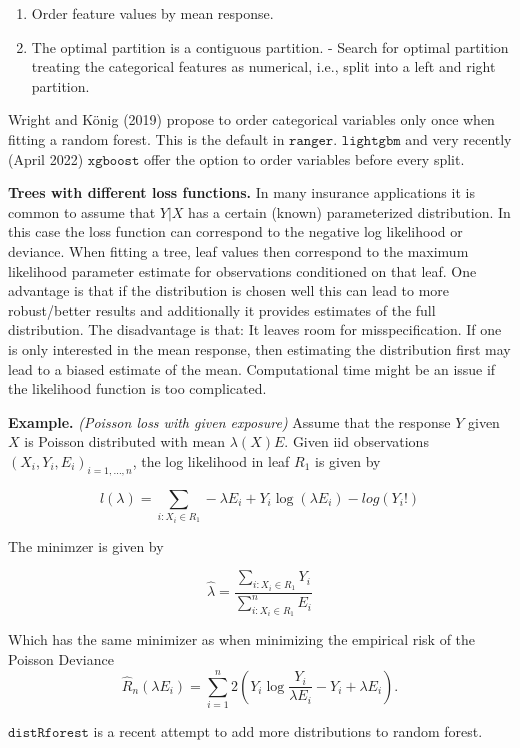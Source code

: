 \documentclass[
]{book}
\providecommand{\tightlist}{%
  \setlength{\itemsep}{0pt}\setlength{\parskip}{0pt}}
\begin{document}
\begin{enumerate}
\def\labelenumi{\arabic{enumi}.}
\tightlist
\item
  Order feature values by mean response.
\item
  The optimal partition is a contiguous partition.
  - Search for optimal partition treating the categorical features as numerical, i.e., split into a left and right partition.
\end{enumerate}

Wright and König (2019) propose to order categorical variables only once when fitting a random forest. This is the default in \(\texttt{ranger}\). \(\texttt{lightgbm}\) and very recently (April 2022) \(\texttt{xgboost}\) offer the option to order variables before every split.

\textbf{Trees with different loss functions.} In many insurance applications it is common to assume that \(Y|X\) has a certain (known) parameterized distribution. In this case the loss function can correspond to the negative log likelihood or deviance. When fitting a tree, leaf values then correspond to the maximum likelihood parameter estimate for observations conditioned on that leaf. One advantage is that if the distribution is chosen well this can lead to more robust/better results and additionally it provides estimates of the full distribution. The disadvantage is that: It leaves room for misspecification. If one is only interested in the mean response, then estimating the distribution first may lead to a biased estimate of the mean. Computational time might be an issue if the likelihood function is too complicated.

\textbf{Example.} \emph{(Poisson loss with given exposure)} Assume that the response \(Y\) given \(X\) is Poisson distributed with mean \(\lambda(X)E\). Given iid observations \((X_i,Y_i,E_i)_{i=1,\dots,n}\), the log likelihood in leaf \(R_1\) is given by

\[
l(\lambda)= \sum_{i: X_i\in R_1} -\lambda E_i+ Y_i\log(\lambda E_i)-log(Y_i!)
\]

The minimzer is given by

\[
\hat \lambda = \frac{\sum_{i: X_i\in R_1}  Y_i}{\sum_{i: X_i\in R_1} ^n E_i}
\]

Which has the same minimizer as when minimizing the empirical risk of the Poisson Deviance
\[
\hat R_n(\lambda E_i)=\sum_{i=1}^n 2\left(Y_i\log {\frac {Y_i}{\lambda E_i }}-Y_i+\lambda E_i \right).
\]

\href{https://github.com/henckr/distRforest}{\(\texttt{distRforest}\)} is a recent attempt to add more distributions to random forest.
\end{document}
